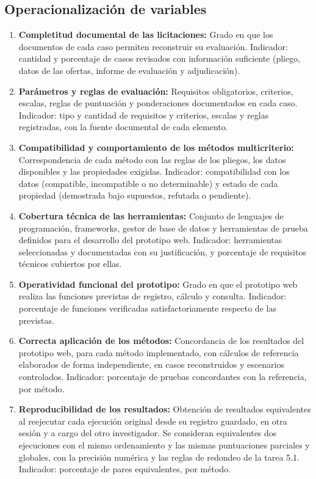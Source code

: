 \documentclass[12pt,a4paper]{article}
\begin{document}
\subsection{Operacionalización de variables}

\begin{enumerate}
\item \textbf{Completitud documental de las licitaciones:} Grado en que los documentos de cada caso permiten reconstruir su evaluación. Indicador: cantidad y porcentaje de casos revisados con información suficiente (pliego, datos de las ofertas, informe de evaluación y adjudicación).
\item \textbf{Parámetros y reglas de evaluación:} Requisitos obligatorios, criterios, escalas, reglas de puntuación y ponderaciones documentados en cada caso. Indicador: tipo y cantidad de requisitos y criterios, escalas y reglas registradas, con la fuente documental de cada elemento.
\item \textbf{Compatibilidad y comportamiento de los métodos multicriterio:} Correspondencia de cada método con las reglas de los pliegos, los datos disponibles y las propiedades exigidas. Indicador: compatibilidad con los datos (compatible, incompatible o no determinable) y estado de cada propiedad (demostrada bajo supuestos, refutada o pendiente).
\item \textbf{Cobertura técnica de las herramientas:} Conjunto de lenguajes de programación, frameworks, gestor de base de datos y herramientas de prueba definidos para el desarrollo del prototipo web. Indicador: herramientas seleccionadas y documentadas con su justificación, y porcentaje de requisitos técnicos cubiertos por ellas.
\item \textbf{Operatividad funcional del prototipo:} Grado en que el prototipo web realiza las funciones previstas de registro, cálculo y consulta. Indicador: porcentaje de funciones verificadas satisfactoriamente respecto de las previstas.
\item \textbf{Correcta aplicación de los métodos:} Concordancia de los resultados del prototipo web, para cada método implementado, con cálculos de referencia elaborados de forma independiente, en casos reconstruidos y escenarios controlados. Indicador: porcentaje de pruebas concordantes con la referencia, por método.
\item \textbf{Reproducibilidad de los resultados:} Obtención de resultados equivalentes al reejecutar cada ejecución original desde su registro guardado, en otra sesión y a cargo del otro investigador. Se consideran equivalentes dos ejecuciones con el mismo ordenamiento y las mismas puntuaciones parciales y globales, con la precisión numérica y las reglas de redondeo de la tarea 5.1. Indicador: porcentaje de pares equivalentes, por método.

\end{enumerate}
\end{document}
